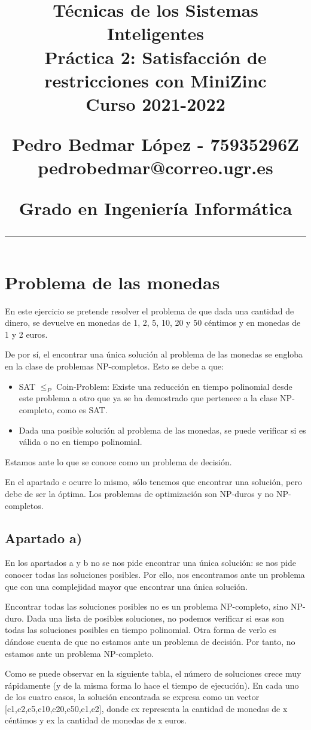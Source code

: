 \documentclass[12pt]{article} %
\title{	

\vspace{-2.5cm}
\LARGE \textbf{Técnicas de los Sistemas Inteligentes} \\
\LARGE Práctica 2: Satisfacción de restricciones con MiniZinc \\[0.5em]
\large Curso 2021-2022 \par
\large Pedro Bedmar López - 75935296Z \\
\normalsize pedrobedmar@correo.ugr.es \par
\large Grado en Ingeniería Informática
\vspace{-7pt}
\rule{\textwidth}{0.4pt}
\vspace{-2cm}
}
\date{}
\begin{document}
\clearpage
\maketitle %

\section{Problema de las monedas}
En este ejercicio se pretende resolver el problema de que dada una cantidad de dinero, se devuelve en monedas de 1, 2, 5, 10, 20 y 50 céntimos y en monedas de 1 y 2 euros.

De por sí, el encontrar una única solución al problema de las monedas se engloba en la clase de problemas NP-completos. Esto se debe a que:
\begin{itemize}
    \item SAT $\leq_P$ Coin-Problem: Existe una reducción en tiempo polinomial desde este problema a otro que ya se ha demostrado que pertenece a la clase NP-completo, como es SAT.
    \item Dada una posible solución al problema de las monedas, se puede verificar si es válida o no en tiempo polinomial.
\end{itemize}
Estamos ante lo que se conoce como un problema de decisión.

En el apartado c ocurre lo mismo, sólo tenemos que encontrar una solución, pero debe de ser la óptima. Los problemas de optimización son NP-duros y no NP-completos.

\subsection{Apartado a)}

En los apartados a y b no se nos pide encontrar una única solución: se nos pide conocer todas las soluciones posibles. Por ello, nos encontramos ante un problema que con una complejidad mayor que encontrar una única solución.

Encontrar todas las soluciones posibles no es un problema NP-completo, sino NP-duro. Dada una lista de posibles soluciones, no podemos verificar si esas son todas las soluciones posibles en tiempo polinomial. Otra forma de verlo es dándose cuenta de que no estamos ante un problema de decisión. Por tanto, no estamos ante un problema NP-completo.

Como se puede observar en la siguiente tabla, el número de soluciones crece muy rápidamente (y de la misma forma lo hace el tiempo de ejecución). En cada uno de los cuatro casos, la solución encontrada se expresa como un vector [c1,c2,c5,c10,c20,c50,e1,e2], donde cx representa la cantidad de monedas de x céntimos y ex la cantidad de monedas de x euros.
\end{document}
